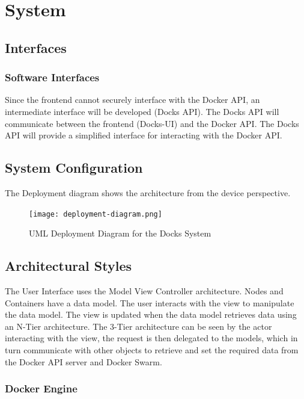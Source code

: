 \documentclass[]{article}
\begin{document}
\section{System}
\subsection{Interfaces}
\subsubsection{Software Interfaces}
Since the frontend cannot securely interface with the Docker API,
an intermediate interface will be developed (Docks API).
The Docks API will communicate between the frontend (Docks-UI) and
the Docker API. The Docks API will provide a simplified interface for
interacting with the Docker API.


\subsection{System Configuration}
The Deployment diagram shows the architecture from the device perspective.

\begin{figure}[H]
	\centering
	\texttt{[image: deployment-diagram.png]}
	\caption{UML Deployment Diagram for the Docks System}
\end{figure}

\subsection{Architectural Styles}

The User Interface uses the Model View Controller architecture.
Nodes and Containers have a data model.
The user interacts with the view to manipulate the data model.
The view is updated when the data model retrieves data using an N-Tier architecture.
The 3-Tier architecture can be seen by the actor interacting with the view,
the request is then delegated to the models, which in turn
communicate with other objects to retrieve and set the required data from
the Docker API server and Docker Swarm.


\subsubsection{Docker Engine}
\end{document}
